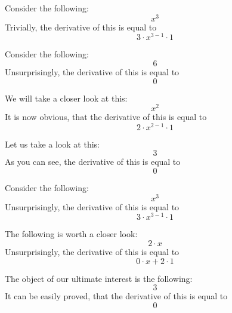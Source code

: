 \documentclass{article}
\begin{document}
Consider the following:
\begin{equation}
x ^{3 } 
\end{equation}
Trivially, the derivative of this is equal to
\begin{equation}
3 \cdot x ^{3 - 1 } \cdot 1 
\end{equation}

Consider the following:
\begin{equation}
6 
\end{equation}
Unsurprisingly, the derivative of this is equal to
\begin{equation}
0 
\end{equation}

We will take a closer look at this:
\begin{equation}
x ^{2 } 
\end{equation}
It is now obvious, that the derivative of this is equal to
\begin{equation}
2 \cdot x ^{2 - 1 } \cdot 1 
\end{equation}

Let us take a look at this:
\begin{equation}
3 
\end{equation}
As you can see, the derivative of this is equal to
\begin{equation}
0 
\end{equation}

Consider the following:
\begin{equation}
x ^{3 } 
\end{equation}
Unsurprisingly, the derivative of this is equal to
\begin{equation}
3 \cdot x ^{3 - 1 } \cdot 1 
\end{equation}

The following is worth a closer look:
\begin{equation}
2 \cdot x 
\end{equation}
Unsurprisingly, the derivative of this is equal to
\begin{equation}
0 \cdot x + 2 \cdot 1 
\end{equation}

The object of our ultimate interest is the following:
\begin{equation}
3 
\end{equation}
It can be easily proved, that the derivative of this is equal to
\begin{equation}
0 
\end{equation}
\end{document}
